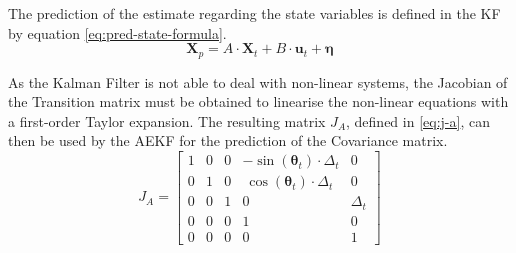 The prediction of the estimate regarding the state variables is defined in the \gls{KF} by equation \eqref{eq:pred-state-formula}.
	\begin{equation}
		\label{eq:pred-state-formula}
		\mathbf{X}_{p} = A \cdot \mathbf{X}_t + B \cdot \mathbf{u}_t + \boldsymbol \eta
	\end{equation}


As the Kalman Filter is not able to deal with non-linear systems, the Jacobian of the Transition matrix must be obtained to linearise the non-linear equations with a first-order Taylor expansion.
The resulting matrix $J_A$, defined in \eqref{eq:j-a}, can then be used by the \gls{AEKF} for the prediction of the Covariance matrix.
\begin{equation}
	\label{eq:j-a}
	J_A
	=
	\begin{bmatrix}
		1 & 0 & 0 & -\sin(\boldsymbol \theta_t) \cdot \Delta_t & 0  \\
		0 & 1 & 0 & ~\cos(\boldsymbol \theta_t) \cdot \Delta_t & 0  \\
		0 & 0 & 1 & 0 & \Delta_t \\
		0 & 0 & 0 & 1 & 0  \\
		0 & 0 & 0 & 0 & 1  
	\end{bmatrix}
\end{equation}

